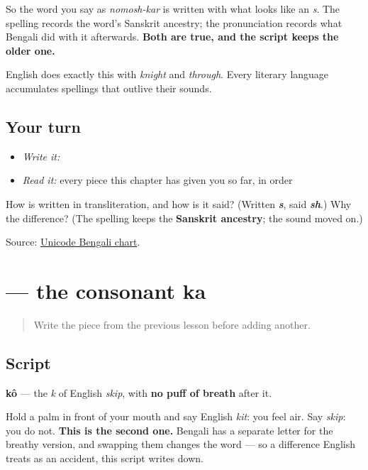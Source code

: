 So the word you say as \emph{nomosh-kar} is written with what looks like an \emph{s}. The spelling records the word's Sanskrit ancestry; the pronunciation records what Bengali did with it afterwards. \textbf{Both are true, and the script keeps the older one.}

English does exactly this with \emph{knight} and \emph{through}. Every literary language accumulates spellings that outlive their sounds.

\subsection*{Your turn}
\begin{itemize}
\raggedright
  \item \emph{Write it:} 
  \item \emph{Read it:} every piece this chapter has given you so far, in order
\end{itemize}

\begin{tcolorbox}[breakable,colback=teal!4,colframe=teal!35!black,title={Before you move on}]
How is \textbf{} written in transliteration, and how is it said? (Written \emph{\textbf{s}}, said \emph{\textbf{sh}}.) Why the difference? (The spelling keeps the \textbf{Sanskrit ancestry}; the sound moved on.)

Source: \href{https://www.unicode.org/charts/PDF/U0980.pdf}{Unicode Bengali chart}.
\end{tcolorbox}
\section[kô]{ — the consonant ka}

\label{lesson:BN-W01-ka}



\begin{quote}
Write the piece from the previous lesson before adding another.
\end{quote}

\subsection*{Script}
\begin{quote}
\end{quote}

\textbf{kô} — the \emph{k} of English \emph{skip}, with \textbf{no puff of breath} after it.

Hold a palm in front of your mouth and say English \emph{kit}: you feel air. Say \emph{skip}: you do not. \textbf{This is the second one.} Bengali has a separate letter for the breathy version, and swapping them changes the word — so a difference English treats as an accident, this script writes down.

